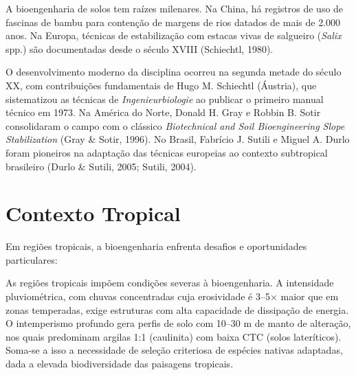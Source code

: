 \documentclass[
  portuguese,
  11pt,
  a4paper,
  open=any]{scrbook}
\begin{document}
A bioengenharia de solos tem raízes milenares. Na China, há registros de
uso de fascinas de bambu para contenção de margens de rios datados de
mais de 2.000 anos. Na Europa, técnicas de estabilização com estacas
vivas de salgueiro (\emph{Salix} spp.) são documentadas desde o século
XVIII (Schiechtl, 1980).

O desenvolvimento moderno da disciplina ocorreu na segunda metade do
século XX, com contribuições fundamentais de Hugo M. Schiechtl
(Áustria), que sistematizou as técnicas de \emph{Ingenieurbiologie} ao
publicar o primeiro manual técnico em 1973. Na América do Norte, Donald
H. Gray e Robbin B. Sotir consolidaram o campo com o clássico
\emph{Biotechnical and Soil Bioengineering Slope Stabilization} (Gray \&
Sotir, 1996). No Brasil, Fabrício J. Sutili e Miguel A. Durlo foram
pioneiros na adaptação das técnicas europeias ao contexto subtropical
brasileiro (Durlo \& Sutili, 2005; Sutili, 2004).

\section{Contexto Tropical}\label{contexto-tropical}

Em regiões tropicais, a bioengenharia enfrenta desafios e oportunidades
particulares:

\begin{tcolorbox}[enhanced jigsaw, leftrule=.75mm, colframe=quarto-callout-important-color-frame, colback=white, bottomrule=.15mm, opacityback=0, colbacktitle=quarto-callout-important-color!10!white, breakable, bottomtitle=1mm, opacitybacktitle=0.6, title=\textcolor{quarto-callout-important-color}{\faExclamation}\hspace{0.5em}{Desafios tropicais}, titlerule=0mm, toprule=.15mm, toptitle=1mm, rightrule=.15mm, left=2mm, arc=.35mm, coltitle=black]

As regiões tropicais impõem condições severas à bioengenharia. A
intensidade pluviométrica, com chuvas concentradas cuja erosividade é
3--5× maior que em zonas temperadas, exige estruturas com alta
capacidade de dissipação de energia. O intemperismo profundo gera perfis
de solo com 10--30 m de manto de alteração, nos quais predominam argilas
1:1 (caulinita) com baixa CTC (solos lateríticos). Soma-se a isso a
necessidade de seleção criteriosa de espécies nativas adaptadas, dada a
elevada biodiversidade das paisagens tropicais.

\end{tcolorbox}
\end{document}
